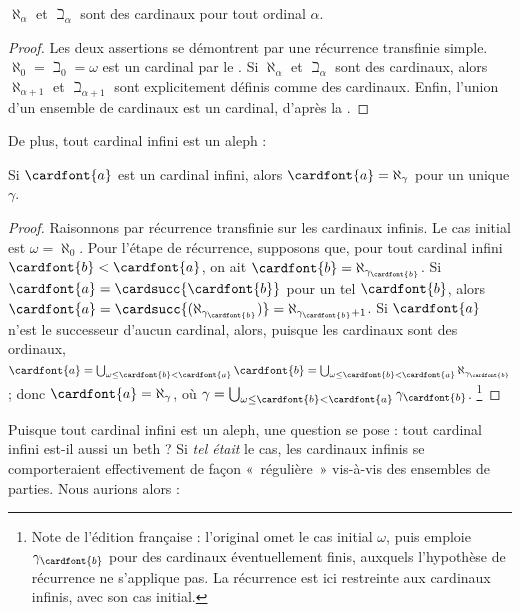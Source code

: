 \documentclass[../../../include/open-logic-section]{subfiles}
\begin{document}
\begin{prop}
$\aleph_\alpha$ et $\beth_\alpha$ sont
des cardinaux pour tout ordinal $\alpha$.
\end{prop}

\begin{proof}
Les deux assertions se démontrent par une
récurrence transfinie simple.
$\aleph_0 = \beth_0 = \omega$ est un cardinal
par le .
Si $\aleph_\alpha$ et $\beth_\alpha$ sont des
cardinaux, alors $\aleph_{\alpha+1}$ et
$\beth_{\alpha+1}$ sont explicitement définis
comme des cardinaux. Enfin, l'union d'un ensemble
de cardinaux est un cardinal, d'après la
.
\end{proof}
\noindent
De plus, tout cardinal infini est un aleph :

\begin{prop}
Si $\cardfont{a}$ est un cardinal infini,
alors $\cardfont{a} = \aleph_\gamma$
pour un unique $\gamma$.
\end{prop}

\begin{proof}
Raisonnons par récurrence transfinie sur les
cardinaux infinis. Le cas initial est
$\omega=\aleph_0$. Pour l'étape de récurrence,
supposons que, pour tout cardinal infini
$\cardfont{b} < \cardfont{a}$, on ait
$\cardfont{b} = \aleph_{\gamma_\cardfont{b}}$.
Si $\cardfont{a} =
\cardsucc{\cardfont{b}}$ pour un tel
$\cardfont{b}$, alors
$\cardfont{a} =
\cardsucc{(\aleph_{\gamma_\cardfont{b}})}
= \aleph_{\gamma_\cardfont{b}+1}$.
Si $\cardfont{a}$ n'est le successeur d'aucun
cardinal, alors, puisque les cardinaux sont des
ordinaux,
$\cardfont{a}
= \bigcup_{\omega \leq \cardfont{b} < \cardfont{a}}
\cardfont{b}
= \bigcup_{\omega \leq \cardfont{b} < \cardfont{a}}
{\aleph_{\gamma_\cardfont{b}}}$ ;
donc $\cardfont{a} = \aleph_\gamma$, où
$\gamma =
\bigcup_{\omega \leq \cardfont{b} < \cardfont{a}}
\gamma_\cardfont{b}$.
%
%
\footnote{Note de l'édition française : l'original
omet le cas initial $\omega$, puis emploie
$\gamma_\cardfont{b}$ pour des cardinaux
éventuellement finis, auxquels l'hypothèse
de récurrence ne s'applique pas. La récurrence
est ici restreinte aux cardinaux infinis,
avec son cas initial.}
\end{proof}

Puisque tout cardinal infini est un aleph,
une question se pose : tout cardinal infini
est-il aussi un beth ? Si \emph{tel était}
le cas, les cardinaux infinis se comporteraient
effectivement de façon «~régulière~»
vis-à-vis des ensembles de parties.
Nous aurions alors :
\end{document}

